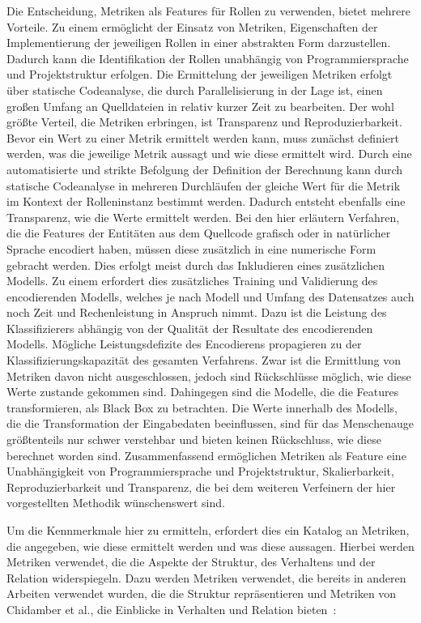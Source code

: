 Die Entscheidung, Metriken als Features für Rollen zu verwenden, bietet mehrere Vorteile. Zu einem ermöglicht der Einsatz von Metriken, Eigenschaften der Implementierung der jeweiligen Rollen in einer abstrakten Form darzustellen.
Dadurch kann die Identifikation der Rollen unabhängig von Programmiersprache und Projektstruktur erfolgen. Die Ermittelung der jeweiligen Metriken erfolgt über statische Codeanalyse, die durch Parallelisierung in der Lage ist,
einen großen Umfang an Quelldateien in relativ kurzer Zeit zu bearbeiten. Der wohl größte Verteil, die Metriken erbringen, ist Transparenz und Reproduzierbarkeit.
Bevor ein Wert zu einer Metrik ermittelt werden kann, muss zunächst definiert werden, was die jeweilige Metrik aussagt und wie diese ermittelt wird. Durch eine automatisierte und strikte Befolgung der Definition der Berechnung kann durch statische Codeanalyse in mehreren Durchläufen der gleiche Wert für die Metrik im Kontext der Rolleninstanz bestimmt werden.
Dadurch entsteht ebenfalls eine Transparenz, wie die Werte ermittelt werden. Bei den hier erläutern Verfahren, die die Features der Entitäten aus dem Quellcode grafisch oder in natürlicher Sprache encodiert haben, müssen diese zusätzlich in eine numerische Form gebracht werden.
Dies erfolgt meist durch das Inkludieren eines zusätzlichen Modells. Zu einem erfordert dies zusätzliches Training und Validierung des encodierenden Modells, welches je nach Modell und Umfang des Datensatzes auch noch Zeit und Rechenleistung in Anspruch nimmt. Dazu ist die Leistung des Klassifizierers abhängig von der Qualität der Resultate des encodierenden Modells. Mögliche Leistungsdefizite des Encodierens propagieren zu der Klassifizierungskapazität des gesamten Verfahrens.
Zwar ist die Ermittlung von Metriken davon nicht ausgeschlossen, jedoch sind Rückschlüsse möglich, wie diese Werte zustande gekommen sind. Dahingegen sind die Modelle, die die Features transformieren, als Black Box zu betrachten. Die Werte innerhalb des Modells, die die Transformation der Eingabedaten beeinflussen, sind für das Menschenauge größtenteils nur schwer verstehbar und bieten keinen Rückschluss, wie diese berechnet worden sind.
Zusammenfassend ermöglichen Metriken als Feature eine Unabhängigkeit von Programmiersprache und Projektstruktur, Skalierbarkeit, Reproduzierbarkeit und Transparenz, die bei dem weiteren Verfeinern der hier vorgestellten Methodik wünschenswert sind.

\pagebreak

Um die Kennmerkmale hier zu ermitteln, erfordert dies ein Katalog an Metriken, die angegeben, wie diese ermittelt werden und was diese aussagen. Hierbei werden Metriken verwendet, die die Aspekte der Struktur, des Verhaltens und der Relation widerspiegeln.
Dazu werden Metriken verwendet, die bereits in anderen Arbeiten verwendet wurden, die die Struktur repräsentieren und Metriken von Chidamber et al., die Einblicke in Verhalten und Relation bieten~\cite{chidamber1994metrics}:


